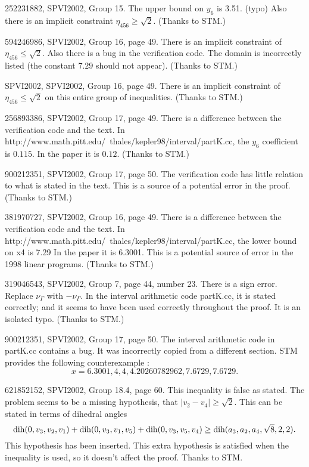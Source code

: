 \documentclass[11pt]{amsart}
\def\op#1{{\text{#1}}}
\def\text{\hbox}
\begin{document}
252231882, SPVI2002, Group 15.  The upper bound on $y_6$ is 3.51. (typo)
Also there is an implicit constraint $\eta_{456}\ge\sqrt2$.
(Thanks to STM.)

594246986, SPVI2002, Group 16, page 49.  There is an implicit constraint of $\eta_{456}\le \sqrt2$.  Also there is a bug in the verification code.  The domain is incorrectly listed (the constant $7.29$ should not appear).  (Thanks to STM.)

SPVI2002, SPVI2002, Group 16, page 49.  There is an implicit constraint of $\eta_{456}\le\sqrt2$ on this entire group of inequalities.
(Thanks to STM.)

256893386, SPVI2002, Group 17, page 49.  There is a difference between the verification code and the text.  In http://www.math.pitt.edu/~thales/kepler98/interval/partK.cc, the $y_6$ coefficient is $0.115$.  In the paper it is $0.12$.
(Thanks to STM.)

900212351, SPVI2002, Group 17, page 50.  The verification code has little relation to what is stated in the text.  This is a source of a potential error in the proof. (Thanks to STM.)

381970727, SPVI2002, Group 16, page 49.   There is a difference between the verification code and the text.  In http://www.math.pitt.edu/~thales/kepler98/interval/partK.cc, the lower bound on x4 is 7.29  In the paper it is 6.3001.  This is a potential source of error in the 1998 linear programs.  (Thanks to STM.)

319046543, SPVI2002, Group 7, page 44, number 23.  There is a sign error.
Replace $\nu_\Gamma$ with $-\nu_\Gamma$.  In the interval arithmetic
code partK.cc, it is stated correctly; and it seems to have been used correctly throughout the proof.  It is an isolated typo.   (Thanks to STM.)

900212351, SPVI2002, Group 17, page 50.  The interval arithmetic code
in partK.cc contains a bug.  
It was incorrectly copied from a different section.
STM provides the following counterexample :
  $$
  x = {6.3001, 4,4, 4.20260782962, 7.6729, 7.6729}.
  $$
  
621852152, SPVI2002, Group 18.4, page 60.
This inequality is false as stated.  
The problem seems to be a missing hypothesis,
that $|v_2-v_4|\ge\sqrt2$.  This can be
stated in terms of dihedral angles
$$
\op{dih}(0,v_3,v_2,v_1) + \op{dih}(0,v_3,v_1,v_5) + \op{dih}(0,v_3,v_5,v_4) \ge \op{dih}(a_3,a_2,a_4,\sqrt{8},2,2).
$$
This hypothesis has been inserted.
This extra hypothesis is satisfied
   when the inequality is used, so it doesn't affect
   the proof.
Thanks to STM.
\end{document}
